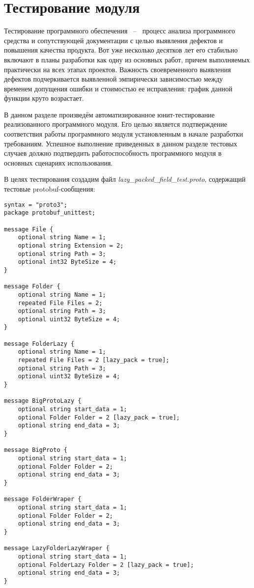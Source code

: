 \section{Тестирование модуля}

Тестирование программного обеспечения ~--~ процесс анализа программного средства и сопутствующей документации с целью выявления
дефектов и повышения качества продукта. Вот уже несколько десятков лет его стабильно включают в планы разработки как одну из основных работ,
причем выполняемых практически на всех этапах проектов. Важность своевременного выявления дефектов подчеркивается выявленной
эмпирически зависимостью между временем допущения ошибки и стоимостью ее исправления: график данной функции круто возрастает.

В данном разделе произведём автоматизированное юнит-тестирование реализованного программного модуля. 
Его целью является подтверждение соответствия работы программного модуля установленным в начале
разработки требованиям. Успешное выполнение приведенных в данном разделе тестовых случаев должно подтвердить работоспособность
программного модуля в основных сценариях использования.

В целях тестирования создадим файл \textit{lazy\_packed\_field\_test.proto}, содержащий тестовые protobuf-сообщения:

\begin{lstlisting}[style=CodeListing]
syntax = "proto3";
package protobuf_unittest;

message File {
    optional string Name = 1;
    optional string Extension = 2;
    optional string Path = 3;
    optional int32 ByteSize = 4;
}

message Folder {
    optional string Name = 1;
    repeated File Files = 2;
    optional string Path = 3;
    optional uint32 ByteSize = 4;
}

message FolderLazy {
    optional string Name = 1;
    repeated File Files = 2 [lazy_pack = true];
    optional string Path = 3;
    optional uint32 ByteSize = 4;
}

message BigProtoLazy {
    optional string start_data = 1;
    optional Folder Folder = 2 [lazy_pack = true];
    optional string end_data = 3;
}

message BigProto {
    optional string start_data = 1;
    optional Folder Folder = 2;
    optional string end_data = 3;
}

message FolderWraper {
    optional string start_data = 1;
    optional Folder Folder = 2;
    optional string end_data = 3;
}

message LazyFolderLazyWraper {
    optional string start_data = 1;
    optional FolderLazy Folder = 2 [lazy_pack = true];
    optional string end_data = 3;
}
\end{lstlisting}

